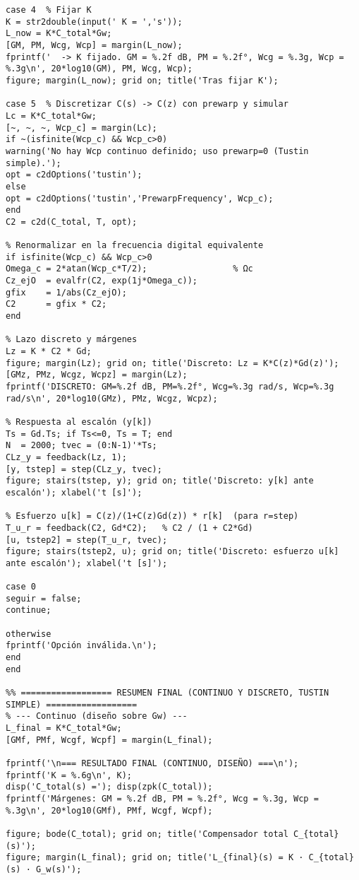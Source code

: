 \begin{lstlisting}[style=matlabstyle,caption={Hoja cálculos utilizada para el diseño de los compensadores.},label={matlab:hojaDeCalculos}]
case 4  % Fijar K
K = str2double(input(' K = ','s'));
L_now = K*C_total*Gw;
[GM, PM, Wcg, Wcp] = margin(L_now);
fprintf('  -> K fijado. GM = %.2f dB, PM = %.2f°, Wcg = %.3g, Wcp = %.3g\n', 20*log10(GM), PM, Wcg, Wcp);
figure; margin(L_now); grid on; title('Tras fijar K');

case 5  % Discretizar C(s) -> C(z) con prewarp y simular
Lc = K*C_total*Gw;
[~, ~, ~, Wcp_c] = margin(Lc);
if ~(isfinite(Wcp_c) && Wcp_c>0)
warning('No hay Wcp continuo definido; uso prewarp=0 (Tustin simple).');
opt = c2dOptions('tustin');
else
opt = c2dOptions('tustin','PrewarpFrequency', Wcp_c);
end
C2 = c2d(C_total, T, opt);

% Renormalizar en la frecuencia digital equivalente
if isfinite(Wcp_c) && Wcp_c>0
Omega_c = 2*atan(Wcp_c*T/2);                 % Ωc
Cz_ejO  = evalfr(C2, exp(1j*Omega_c));
gfix    = 1/abs(Cz_ejO);
C2      = gfix * C2;
end

% Lazo discreto y márgenes
Lz = K * C2 * Gd;
figure; margin(Lz); grid on; title('Discreto: Lz = K*C(z)*Gd(z)');
[GMz, PMz, Wcgz, Wcpz] = margin(Lz);
fprintf('DISCRETO: GM=%.2f dB, PM=%.2f°, Wcg=%.3g rad/s, Wcp=%.3g rad/s\n', 20*log10(GMz), PMz, Wcgz, Wcpz);

% Respuesta al escalón (y[k])
Ts = Gd.Ts; if Ts<=0, Ts = T; end
N  = 2000; tvec = (0:N-1)'*Ts;
CLz_y = feedback(Lz, 1);
[y, tstep] = step(CLz_y, tvec);
figure; stairs(tstep, y); grid on; title('Discreto: y[k] ante escalón'); xlabel('t [s]');

% Esfuerzo u[k] = C(z)/(1+C(z)Gd(z)) * r[k]  (para r=step)
T_u_r = feedback(C2, Gd*C2);   % C2 / (1 + C2*Gd)
[u, tstep2] = step(T_u_r, tvec);
figure; stairs(tstep2, u); grid on; title('Discreto: esfuerzo u[k] ante escalón'); xlabel('t [s]');

case 0
seguir = false;
continue;

otherwise
fprintf('Opción inválida.\n');
end
end

%% ================== RESUMEN FINAL (CONTINUO Y DISCRETO, TUSTIN SIMPLE) ==================
% --- Continuo (diseño sobre Gw) ---
L_final = K*C_total*Gw;
[GMf, PMf, Wcgf, Wcpf] = margin(L_final);

fprintf('\n=== RESULTADO FINAL (CONTINUO, DISEÑO) ===\n');
fprintf('K = %.6g\n', K);
disp('C_total(s) ='); disp(zpk(C_total));
fprintf('Márgenes: GM = %.2f dB, PM = %.2f°, Wcg = %.3g, Wcp = %.3g\n', 20*log10(GMf), PMf, Wcgf, Wcpf);

figure; bode(C_total); grid on; title('Compensador total C_{total}(s)');
figure; margin(L_final); grid on; title('L_{final}(s) = K · C_{total}(s) · G_w(s)');


\end{lstlisting}
